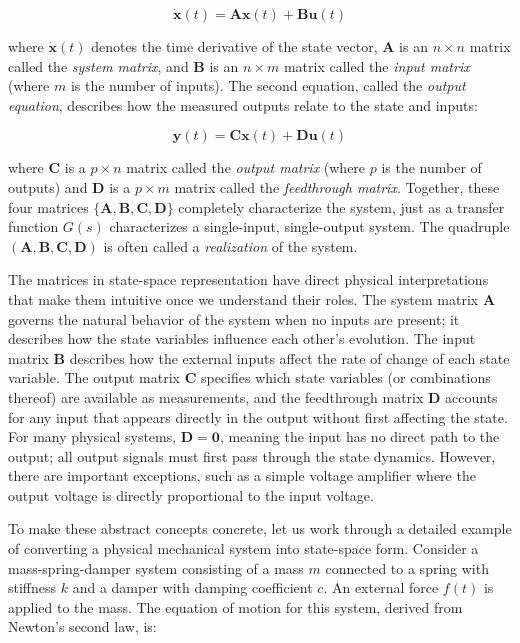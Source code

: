 \begin{equation}
\dot{\mathbf{x}}(t) = \mathbf{A}\mathbf{x}(t) + \mathbf{B}\mathbf{u}(t)
\end{equation}

where $\dot{\mathbf{x}}(t)$ denotes the time derivative of the state vector, $\mathbf{A}$ is an $n \times n$ matrix called the \emph{system matrix}, and $\mathbf{B}$ is an $n \times m$ matrix called the \emph{input matrix} (where $m$ is the number of inputs). The second equation, called the \emph{output equation}, describes how the measured outputs relate to the state and inputs:

\begin{equation}
\mathbf{y}(t) = \mathbf{C}\mathbf{x}(t) + \mathbf{D}\mathbf{u}(t)
\end{equation}

where $\mathbf{C}$ is a $p \times n$ matrix called the \emph{output matrix} (where $p$ is the number of outputs) and $\mathbf{D}$ is a $p \times m$ matrix called the \emph{feedthrough matrix}. Together, these four matrices $\{\mathbf{A}, \mathbf{B}, \mathbf{C}, \mathbf{D}\}$ completely characterize the system, just as a transfer function $G(s)$ characterizes a single-input, single-output system. The quadruple $(\mathbf{A}, \mathbf{B}, \mathbf{C}, \mathbf{D})$ is often called a \emph{realization} of the system.

The matrices in state-space representation have direct physical interpretations that make them intuitive once we understand their roles. The system matrix $\mathbf{A}$ governs the natural behavior of the system when no inputs are present; it describes how the state variables influence each other's evolution. The input matrix $\mathbf{B}$ describes how the external inputs affect the rate of change of each state variable. The output matrix $\mathbf{C}$ specifies which state variables (or combinations thereof) are available as measurements, and the feedthrough matrix $\mathbf{D}$ accounts for any input that appears directly in the output without first affecting the state. For many physical systems, $\mathbf{D} = \mathbf{0}$, meaning the input has no direct path to the output; all output signals must first pass through the state dynamics. However, there are important exceptions, such as a simple voltage amplifier where the output voltage is directly proportional to the input voltage.

To make these abstract concepts concrete, let us work through a detailed example of converting a physical mechanical system into state-space form. Consider a mass-spring-damper system consisting of a mass $m$ connected to a spring with stiffness $k$ and a damper with damping coefficient $c$. An external force $f(t)$ is applied to the mass. The equation of motion for this system, derived from Newton's second law, is:

